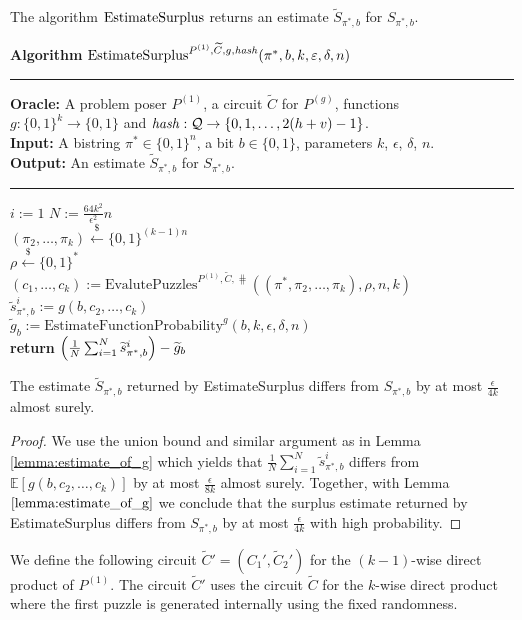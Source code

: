 The algorithm $\operatorname{\text{EstimateSurplus}}$ returns an estimate $\widetilde{S}_{\pi^*, b}$ for $S_{\pi^*, b}$.
%
\begin{codeblock}
  \textbf{Algorithm} $\operatorname{\text{EstimateSurplus}}^{P^{(1)}, \widetilde{C}, g, \operatorname{\mathit{hash}}}(\pi^*, b, k, \varepsilon, \delta, n)$
  \medskip\hrule
  \textbf{Oracle:} A problem poser $P^{(1)}$, a circuit $\widetilde{C}$ for $P^{(g)}$, functions \\
  \IndII $g: \{0,1\}^{k} \rightarrow \{0,1\}$ and  $\operatorname{\mathit{hash}} : \mathcal{Q} \rightarrow \{0,1,\dots, 2(h+v)-1\}$.\\
  \textbf{Input:} A bistring $\pi^* \in \{0,1\}^{n}$, a bit $b \in \{0,1\}$, parameters $k$, $\epsilon$, $\delta$, $n$.\\
  \textbf{Output:} An estimate $\widetilde{S}_{\pi^*, b}$ for $S_{\pi^*, b}$.
  \medskip\hrule
  \For $i:=1$ \To $N := \frac{64k^2}{\epsilon^2}n$ \Do \\
  \IndI $(\pi_{2}, \dots, \pi_k) \xleftarrow{\$} \{0,1\}^{(k-1)n}$\\
  \IndI $\rho \xleftarrow{\$} \{0,1\}^{*}$\\
  \IndI $(c_1, \dots, c_k) := \text{EvalutePuzzles}^{P^{(1)}, \widetilde{C}, \hash}((\pi^*, \pi_2, \dots, \pi_k), \rho, n, k)$\\
  \IndI $\widetilde{s}_{\pi^*,b}^i := g(b, c_{2}, \dots, c_k)$\\
  $\widetilde{g}_b := \text{EstimateFunctionProbability}^{g}(b, k, \epsilon, \delta, n)$ \\
  \textbf{return} $\Bigl(\frac{1}{N} \sum_{i=1}^N \widetilde{s}_{\pi^*,b}^i \Bigr) - \widetilde{g}_b$
\end{codeblock}
%
\begin{lemma}
  \label{lemma:surplus_estimate}
The estimate $\widetilde{S}_{\pi^*,b}$ returned by EstimateSurplus differs from $S_{\pi^*, b}$ by at most $\frac{\epsilon}{4k}$ almost surely.
\end{lemma}

\begin{proof}
We use the union bound and similar argument as in Lemma \ref{lemma:estimate_of_g}
which yields that $\frac{1}{N} \sum_{i=1}^{N} \widetilde{s}_{\pi^*,b}^i$ differs from
$\mathbb{E}[g(b, c_2, \dots, c_k)]$ by at most $\frac{\epsilon}{8k}$ almost surely. Together, with Lemma $\ref{lemma:estimate_of_g}$ we conclude that the surplus estimate
returned by EstimateSurplus differs from $S_{\pi^*,b}$ by at most $\frac{\epsilon}{4k}$ with high probability.
\end{proof}
%
We define the following circuit $\widetilde{C}' = (C_1', \widetilde{C}_2')$ for the $(k-1)$-wise direct product of $P^{(1)}$.
The circuit $\widetilde{C}'$ uses the circuit $\widetilde{C}$ for the $k$-wise direct product where
the first puzzle is generated internally using the fixed randomness.

